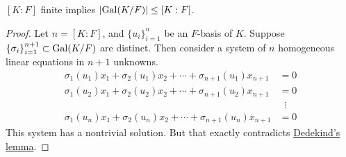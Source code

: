 \begin{theorem}\label{thm:galois-group-size}
    \([K:F]\) finite implies \(\abs{\operatorname{Gal}(K/F)} \leq [K:F]\).
\end{theorem}
\begin{proof}
    Let \(n = [K:F]\), and \({\{u_i\}}_{i=1}^n\) be an \(F\)-basis of \(K\).
    Suppose \({\{\sigma_i\}}_{i=1}^{n+1} \subset \operatorname{Gal}(K/F)\) are distinct.
    Then consider a system of \(n\) homogeneous linear equations in \(n+1\) unknowns.
    \begin{align*}
        \sigma_1(u_1)x_1 + \sigma_2(u_1)x_2  + \cdots + \sigma_{n+1}(u_1)x_{n+1} &= 0 \\
        \sigma_1(u_2)x_1 + \sigma_2(u_2)x_2  + \cdots + \sigma_{n+1}(u_2)x_{n+1} &= 0 \\
        &\;\;\vdots \\
        \sigma_1(u_n)x_1 + \sigma_2(u_n)x_2  + \cdots + \sigma_{n+1}(u_n)x_{n+1} &= 0
    \end{align*}
    This system has a nontrivial solution.
    But that exactly contradicts \hyperref[lem:dedekind]{Dedekind's lemma}.
\end{proof}

